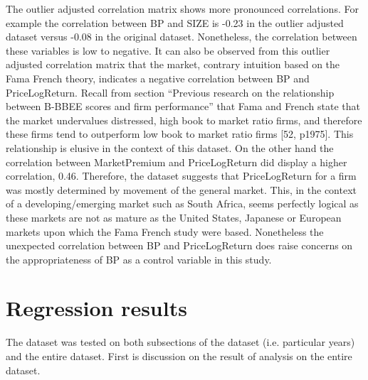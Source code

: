 The outlier adjusted correlation matrix shows more pronounced correlations. For example the correlation between BP and SIZE is -0.23 in the outlier adjusted dataset versus -0.08 in the original dataset. Nonetheless, the correlation between these variables is low to negative. It can also be observed from this outlier adjusted correlation matrix that the market, contrary intuition based on the Fama French theory, indicates a negative correlation between BP and PriceLogReturn. Recall from section “Previous research on the relationship between B-BBEE scores and firm performance” that Fama and French state that the market undervalues distressed, high book to market ratio firms, and therefore these firms tend to outperform low book to market ratio firms [52, p1975]. This relationship is elusive in the context of this dataset. On the other hand the correlation between MarketPremium and PriceLogReturn did display a higher correlation, 0.46. Therefore, the dataset suggests that PriceLogReturn for a firm was mostly determined by movement of the general market. This, in the context of a developing/emerging market such as South Africa, seems perfectly logical as these markets are not as mature as the United States, Japanese or European markets upon which the Fama French study were based. Nonetheless the unexpected correlation between BP and PriceLogReturn does raise concerns on the appropriateness of BP as a control variable in this study.
\section{Regression results}
The dataset was tested on both subsections of the dataset (i.e. particular years) and the entire dataset. First is discussion on the result of analysis on the entire dataset. 

